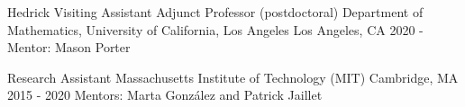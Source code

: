 

\begin{cventries}

\cventry
{Hedrick Visiting Assistant Adjunct Professor (postdoctoral)} %
{Department of Mathematics, University of California, Los Angeles} %
{Los Angeles, CA} %
{2020 - } %
{Mentor: Mason Porter}

\cventry
{Research Assistant} %
{Massachusetts Institute of Technology (MIT)} %
{Cambridge, MA} %
{2015 - 2020} %
{Mentors: Marta Gonz\'{a}lez and Patrick Jaillet}
\end{cventries}